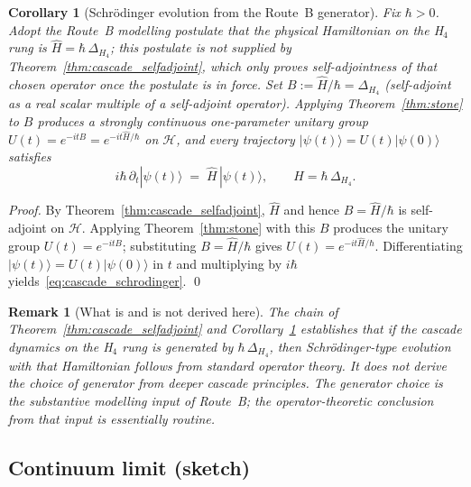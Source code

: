 \documentclass[12pt]{article}
\newtheorem{corollary}[theorem]{Corollary}
\newtheorem{remark}[theorem]{Remark}
\begin{document}
\begin{corollary}[Schr\"odinger evolution from the Route~B generator]\label{cor:schrodinger_from_cascade}
Fix $\hbar > 0$. Adopt the Route~B modelling postulate that the physical Hamiltonian on the H${}_4$ rung is $\hat H = \hbar\,\Delta_{H_4}$; this postulate is \emph{not} supplied by Theorem~\ref{thm:cascade_selfadjoint}, which only proves self-adjointness of that chosen operator once the postulate is in force. Set $B := \hat H / \hbar = \Delta_{H_4}$ (self-adjoint as a real scalar multiple of a self-adjoint operator). Applying Theorem~\ref{thm:stone} to $B$ produces a strongly continuous one-parameter unitary group $U(t) = e^{-itB} = e^{-it\hat H/\hbar}$ on $\mathcal{H}$, and every trajectory $|\psi(t)\rangle = U(t)|\psi(0)\rangle$ satisfies
\begin{equation}\label{eq:cascade_schrodinger}
    i\hbar\,\partial_t |\psi(t)\rangle \;=\; \hat H\,|\psi(t)\rangle, \qquad \hat H = \hbar\,\Delta_{H_4}.
\end{equation}
\end{corollary}

\begin{proof}
By Theorem~\ref{thm:cascade_selfadjoint}, $\hat H$ and hence $B = \hat H/\hbar$ is self-adjoint on $\mathcal{H}$. Applying Theorem~\ref{thm:stone} with this $B$ produces the unitary group $U(t) = e^{-itB}$; substituting $B = \hat H/\hbar$ gives $U(t) = e^{-it\hat H/\hbar}$. Differentiating $|\psi(t)\rangle = U(t)|\psi(0)\rangle$ in $t$ and multiplying by $i\hbar$ yields~\eqref{eq:cascade_schrodinger}. \qed
\end{proof}

\begin{remark}[What is and is not derived here]\label{rem:route_b_scope}
The chain of Theorem~\ref{thm:cascade_selfadjoint} and Corollary~\ref{cor:schrodinger_from_cascade} establishes that \emph{if} the cascade dynamics on the H${}_4$ rung is generated by $\hbar\,\Delta_{H_4}$, \emph{then} Schr\"odinger-type evolution with that Hamiltonian follows from standard operator theory. It does \emph{not} derive the choice of generator from deeper cascade principles. The generator choice is the substantive modelling input of Route~B; the operator-theoretic conclusion from that input is essentially routine.
\end{remark}

\subsection{Continuum limit (sketch)}
\end{document}
